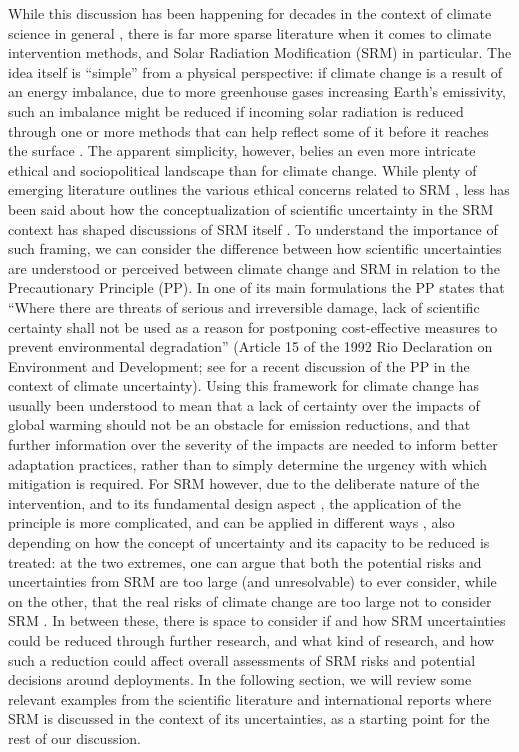 \documentclass[draft]{agujournal2019}
\begin{document}
While this discussion has been happening for decades in the context of climate science in general \cite{Oreskes2004}, there is far more sparse literature when it comes to climate intervention methods, and Solar Radiation Modification (SRM) in particular. The idea itself is ``simple'' from a physical perspective: if climate change is a result of an energy imbalance, due to more greenhouse gases increasing Earth's emissivity, such an imbalance might be reduced if incoming solar radiation is reduced through one or more methods that can help reflect some of it before it reaches the surface \cite{Budyko1977,Govin2003}. The apparent simplicity, however, belies an even more intricate ethical and sociopolitical landscape than for climate change. While plenty of emerging literature outlines the various ethical concerns related to SRM \cite <for a recent review, see>[]{Flegal2019}, less has been said about how the conceptualization of scientific uncertainty in the SRM context has shaped discussions of SRM itself \cite <an exception being>[]{Wiertz2016}. To understand the importance of such framing, we can consider the difference between how scientific uncertainties are understood or perceived between climate change and SRM in relation to the Precautionary Principle (PP). In one of its main formulations the PP states that ``Where there are threats of serious and irreversible damage, lack of scientific certainty shall not be used as a reason for postponing cost-effective measures to prevent environmental degradation'' (Article 15 of the 1992 Rio Declaration on Environment and Development; see  for a recent discussion of the PP in the context of climate uncertainty). Using this framework for climate change has usually been understood to mean that a lack of certainty over the impacts of global warming should not be an obstacle for emission reductions, and that further information over the severity of the impacts are needed to inform better adaptation practices, rather than to simply determine the urgency with which mitigation is required. For SRM however, due to the deliberate nature of the intervention, and to its fundamental design aspect \cite{Kravitz2016}, the application of the principle is more complicated, and can be applied in different ways \cite{Tedsen2013,Davies_Vinders_2025}, also depending on how the concept of uncertainty and its capacity to be reduced is treated: at the two extremes, one can argue that both the potential risks and uncertainties from SRM are too large (and unresolvable) to ever consider, while on the other, that the real risks of climate change are too large not to consider SRM \cite{Baiman2024}. In between these, there is space to consider if and how SRM uncertainties could be reduced through further research, and what kind of research, and how such a reduction could affect overall assessments of SRM risks and potential decisions around deployments.
In the following section, we will review some relevant examples from the scientific literature and international reports where SRM is discussed in the context of its uncertainties, as a starting point for the rest of our discussion.
\end{document}
